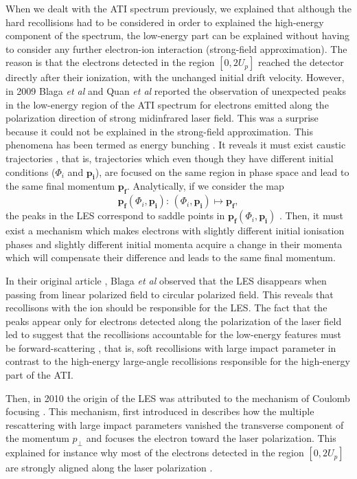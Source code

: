 \documentclass[a4paper]{article}
\begin{document}
When we dealt with the ATI spectrum previously, we explained that although the hard recollisions had to be considered in order to explained the high-energy component of the spectrum, the low-energy part can be explained without having to consider any further electron-ion interaction (strong-field approximation). The reason is that the electrons detected in the region $[0,2U_{p}]$ reached the detector directly after their ionization, with the unchanged initial drift velocity.
However, in 2009 Blaga \textit{et al} \cite{Blaga_2009} and Quan \textit{et al} \cite{Quan_2009} reported the observation of unexpected peaks in the low-energy region of the ATI spectrum for electrons emitted along the polarization direction of strong midinfrared laser field. This was a surprise because it could not be explained in the strong-field approximation. This phenomena has been termed as energy bunching \cite{Kastner_2012_soft}. It reveals it must exist caustic trajectories \cite{Yan_2010}, that is, trajectories which even though they have different initial conditions ($\Phi_{i}$ and $\mathbf{p_{i}}$), are focused on the same region in phase space and lead to the same final momentum $\mathbf{p_{f}}$. Analytically, if we consider the map 
\begin{equation}
\mathbf{p_{f}}(\Phi_{i},\mathbf{p_{i}}): \, (\Phi_{i},\mathbf{p_{i}}) \mapsto \mathbf{p_{f}},
\end{equation}
the peaks in the LES correspond to saddle points in $\mathbf{p_{f}}(\Phi_{i},\mathbf{p_{i}})$ \cite{Kastner_2012_soft}.
Then, it must exist a mechanism which makes electrons with slightly different initial ionisation phases and slightly different initial momenta acquire a change in their momenta which will compensate their difference and leads to the same final momentum.
\par
In their original article \cite{Blaga_2009}, Blaga \textit{et al} observed that the LES disappears when passing from linear polarized field to circular polarized field. This reveals that recollisons with the ion should be responsible for the LES.
The fact that the peaks appear only for electrons detected along the polarization of the laser field led to suggest that the recollisions accountable for the low-energy features must be forward-scattering \cite{Faisal_2009}, that is, soft recollisions with large impact parameter in contrast to the high-energy large-angle recollisions responsible for the high-energy part of the ATI. 
\par 
Then, in 2010 the origin of the LES was attributed to the mechanism of Coulomb focusing \cite{Liu_2010}. This mechanism, first introduced in \cite{Misha_1996} describes how the multiple rescattering with large impact parameters vanished the transverse component of the momentum $p_{\perp}$ and focuses the electron toward the laser polarization. This explained for instance why most of the electrons detected in the region $[0,2U_{p}]$ are strongly aligned along the laser polarization \cite{Walker_1996}.
\end{document}
